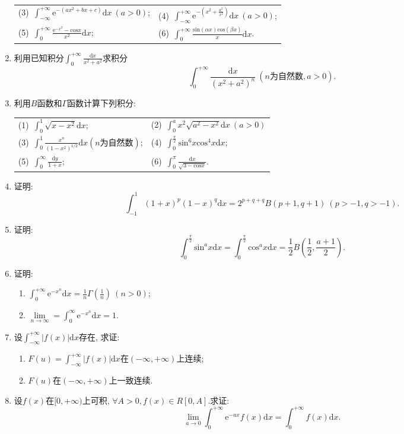 \begin{enumerate}
\begin{table}[H]
\begin{tabular}{ll}
		(3)\ $\displaystyle{\int_{-\infty}^{+\infty}\mathrm{e}^{-(ax^2+bx+c)}\mathrm{d}x}\ (a>0)$;\qquad \qquad \qquad \qquad & (4)\ $\displaystyle{\int_{-\infty}^{+\infty}\mathrm{e}^{-(x^2+\frac{a^2}{x^2})}\mathrm{d}x}\ (a>0)$;\\
		(5)\ $\displaystyle{\int_{0}^{+\infty}\frac{\mathrm{e}^{-x^2}-\mathrm{cos}x}{x^2}\mathrm{d}x}$;\qquad \qquad \qquad \qquad &(6)\ $\displaystyle{\int_{0}^{+\infty}\frac{\mathrm{sin}(\alpha x)\mathrm{cos}(\beta x)}{x}\mathrm{d}x}$.
	\end{tabular}
\end{table}
\item 利用已知积分$\displaystyle{\int_{0}^{+\infty}\frac{\mathrm{d}x}{x^2+a^2}}$求积分
$$ \displaystyle{\int_{0}^{+\infty}\frac{\mathrm{d}x}{(x^2+a^2)^n}}\ (n\text{为自然数}, a>0).$$
\item 利用$B$函数和$\varGamma$函数计算下列积分:
\begin{table}[H]
	\begin{tabular}{ll}
		(1)\ $\displaystyle{\int_{0}^{1}\sqrt{x-x^2}\mathrm{d}x}$;\qquad \qquad \qquad \qquad &(2)\ $\displaystyle{\int_{0}^{a}x^2\sqrt{a^2-x^2}
		\mathrm{d}x}\ (a>0)$\\
		(3)\ $\displaystyle{\int_{0}^{1}\frac{x^n}{(1-x^2)^{1/2}}\mathrm{d}x}(n\text{为自然数})$;\qquad \qquad \qquad \qquad &(4)\ $\displaystyle{\int_{0}^{\frac{\pi}{2}}\mathrm{sin}^6x\mathrm{cos}^4x\mathrm{d}x}$;\\
		(5)\ $\displaystyle{\int_{0}^{\infty}\frac{\mathrm{d}y}{1+x}}$;\qquad \qquad \qquad \qquad &(6)\ $\displaystyle{\int_{0}^{\pi}\frac{\mathrm{d}x}{\sqrt{3-\mathrm{cos}x}}}$.
	\end{tabular}
\end{table}
\item 证明:
$$\displaystyle{\int_{-1}^{1}(1+x)^p(1-x)^q\mathrm{d}x = 2^{p+q+q}B(p+1,q+1)\ (p>-1,q>-1)}.$$
\item 证明:
$$ \displaystyle{\int_{0}^{\frac{\pi}{2}}\mathrm{sin}^ax\mathrm{d}x=\int_{0}^{\frac{\pi}{2}}\mathrm{cos}^ax\mathrm{d}x=\frac{1}{2}B(\frac{1}{2},\frac{a+1}{2})}.$$
\item  证明:
\begin{enumerate}
	\item $\displaystyle{\int_{0}^{+\infty}\mathrm{e}^{-x^n}\mathrm{d}x=\frac{1}{n}\varGamma(\frac{1}{n})\ (n>0)}$;
	\item $\displaystyle{\lim\limits_{n\rightarrow \infty}=\int_{0}^{\infty}\mathrm{e}^{-x^n}\mathrm{d}x=1}$.
\end{enumerate}
\item 设$\displaystyle{\int_{-\infty}^{+\infty}|f(x)|\mathrm{d}x}$存在, 求证:
\begin{enumerate}
	\item $F(u)=\displaystyle{\int_{-\infty}^{+\infty}|f(x)|\mathrm{d}x}$在$(-\infty,+\infty)$上连续;
	\item $F(u)$在$(-\infty,+\infty)$上一致连续.
\end{enumerate}
\item 设$f(x)$在$[0,+\infty)$上可积, $\forall A>0,f(x)\in R[0,A]$.求证:
$$\lim\limits_{a\rightarrow 0}\int_{0}^{+\infty}\mathrm{e}^{-ax}f(x)\mathrm{d}x=\int_{0}^{+\infty}f(x)\mathrm{d}x.$$
\end{enumerate}